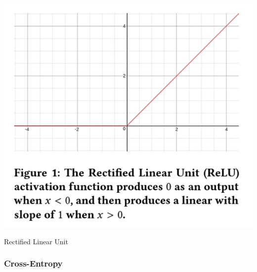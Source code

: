 \documentclass[12pt]{article}
\begin{document}
                \begin{table}[h]
            
                    \begin{center}
    
                        \includegraphics[scale=0.8]{relu.png}
                        \caption{Rectified Linear Unit \cite{agarap2019}}
                        \label{relu-fig}
            
                    \end{center}
                    
                \end{table}            

                
            \subsubsection{Cross-Entropy}
                
\end{document}
